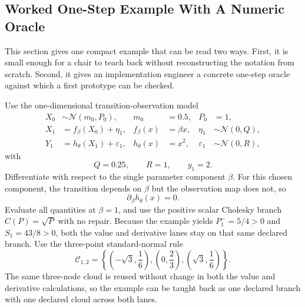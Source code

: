 \documentclass[11pt]{article}
\numberwithin{equation}{section}
\newcommand{\N}{\mathcal N}
\begin{document}
\subsection{Worked One-Step Example With A Numeric Oracle}
\label{sec:p32-worked-example}

This section gives one compact example that can be read two ways.  First, it is
small enough for a chair to teach back without reconstructing the notation from
scratch.  Second, it gives an implementation engineer a concrete one-step oracle
against which a first prototype can be checked.

Use the one-dimensional transition-observation model
\begin{align}
  X_0 &\sim \N(m_0,P_0),
  &m_0&=0.5,
  &P_0&=1,
  \label{eq:p32-example-initial}\\
  X_1 &= f_\beta(X_0)+\eta_1,
  &f_\beta(x)&=\beta x,
  &\eta_1&\sim \N(0,Q),
  \label{eq:p32-example-transition}\\
  Y_1 &= h_\theta(X_1)+\varepsilon_1,
  &h_\theta(x)&=x^2,
  &\varepsilon_1&\sim \N(0,R),
  \label{eq:p32-example-observation}
\end{align}
with
\begin{equation}
  Q=0.25,
  \qquad
  R=1,
  \qquad
  y_1=2.
  \label{eq:p32-example-QRy}
\end{equation}
Differentiate with respect to the single parameter component \(\beta\).  For
this chosen component, the transition depends on \(\beta\) but the observation
map does not, so
\begin{equation}
  \partial_\beta h_\theta(x)=0.
  \label{eq:p32-example-hbeta-zero}
\end{equation}
Evaluate all quantities at \(\beta=1\), and use the positive scalar Cholesky
branch \(C(P)=\sqrt P\) with no repair.  Because the example yields
\(P_1^-=5/4>0\) and \(S_1=43/8>0\), both the value and derivative lanes stay on
that same declared branch.  Use the three-point standard-normal rule
\begin{equation}
  \mathcal C_{1,2}
  =
  \left\{
  \left(-\sqrt3,\frac16\right),
  \left(0,\frac23\right),
  \left(\sqrt3,\frac16\right)
  \right\}.
  \label{eq:p32-example-cloud}
\end{equation}
The same three-node cloud is reused without change in both the value and
derivative calculations, so the example can be taught back as one declared branch with one declared cloud across both lanes.
\end{document}
